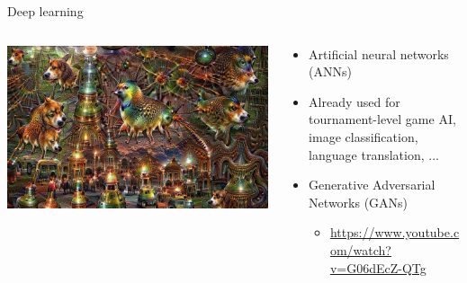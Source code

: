 \begin{frame}{Deep learning}
	\begin{columns}
		\begin{column}{0.4\textwidth}
			\pause\includegraphics[width=\textwidth]{deepdream}
		\end{column}
		\begin{column}{0.55\textwidth}
			\begin{itemize}
				\pause\item Artificial neural networks (ANNs)
				\pause\item Already used for tournament-level game AI, image classification, language translation, ...
				\pause\item Generative Adversarial Networks (GANs)
				    \begin{itemize}
				        \item \url{https://www.youtube.com/watch?v=G06dEcZ-QTg}
				    \end{itemize}
			\end{itemize}
		\end{column}
	\end{columns}
\end{frame}

